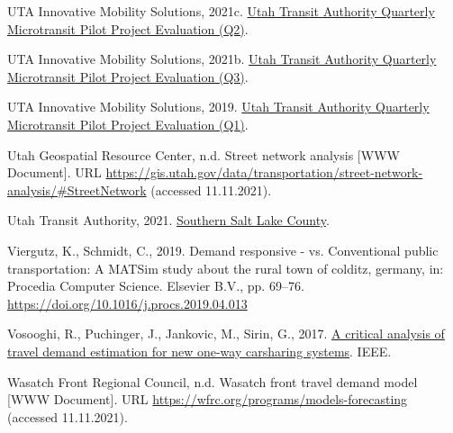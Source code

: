 \documentclass[
]{article}
\newlength{\cslhangindent}
\newlength{\cslentryspacingunit} %
\newenvironment{CSLReferences}[2] %
 {%
  \setlength{\parindent}{0pt}
  \ifodd #1
  \let\oldpar\par
  \def\par{\hangindent=\cslhangindent\oldpar}
  \fi
  \setlength{\parskip}{#2\cslentryspacingunit}
 }%
 {}
\begin{document}
\begin{CSLReferences}{1}{0}
\leavevmode{}%
UTA Innovative Mobility Solutions, 2021c. \href{https://www.rideuta.com/-/media/Files/Services/Via/Final_UTA_Microtransit_Pilot_Q2_Report.ashx?la=en}{{Utah Transit Authority Quarterly Microtransit Pilot Project Evaluation (Q2)}}.

\leavevmode{}%
UTA Innovative Mobility Solutions, 2021b. \href{https://www.rideuta.com/-/media/Files/Services/Via/Final_UTA_Microtransit_Pilot_Q3_Report.ashx?la=en}{{Utah Transit Authority Quarterly Microtransit Pilot Project Evaluation (Q3)}}.

\leavevmode{}%
UTA Innovative Mobility Solutions, 2019. \href{https://www.rideuta.com/-/media/Files/About-UTA/Reports/Via/Microtransit_Evaluation_Dec_2019.ashx}{{Utah Transit Authority Quarterly Microtransit Pilot Project Evaluation (Q1)}}.

\leavevmode{}%
Utah Geospatial Resource Center, n.d. Street network analysis {[}WWW Document{]}. URL \url{https://gis.utah.gov/data/transportation/street-network-analysis/\#StreetNetwork} (accessed 11.11.2021).

\leavevmode{}%
Utah Transit Authority, 2021. \href{https://www.rideuta.com/Services/UTA-On-Demand/Southern-Salt-Lake-County}{{Southern Salt Lake County}}.

\leavevmode{}%
Viergutz, K., Schmidt, C., 2019. Demand responsive - vs. Conventional public transportation: A MATSim study about the rural town of colditz, germany, in: Procedia Computer Science. Elsevier B.V., pp. 69--76. \url{https://doi.org/10.1016/j.procs.2019.04.013}

\leavevmode{}%
Vosooghi, R., Puchinger, J., Jankovic, M., Sirin, G., 2017. \href{https://hal.archives-ouvertes.fr/hal-01622293}{A critical analysis of travel demand estimation for new one-way carsharing systems}. IEEE.

\leavevmode{}%
Wasatch Front Regional Council, n.d. Wasatch front travel demand model {[}WWW Document{]}. URL \url{https://wfrc.org/programs/models-forecasting} (accessed 11.11.2021).

\end{CSLReferences}
\end{document}
